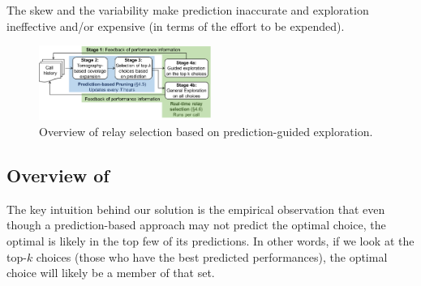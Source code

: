 The skew and the variability make prediction inaccurate and exploration ineffective and/or expensive (in terms of the effort to be expended).



\begin{figure}[t!]
\centering
\includegraphics[width=0.5\textwidth]{figures/Via-Overview-new-ethan.pdf}
\caption{Overview of \hybrid relay selection based on prediction-guided exploration.}
\label{fig:intuition}
\end{figure}

\subsection{Overview of \hybrid}
\label{subsec:Via-approach}

The key intuition behind our solution is the empirical observation that even though a prediction-based approach 
may not predict the optimal choice, the optimal is likely in the top few of its predictions. In other words, if we look at the top-$k$ choices 
(those who have the best predicted performances), the optimal choice will likely be a member of that set.%


